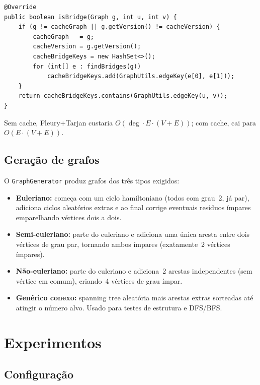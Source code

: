 \documentclass[12pt]{article}
\begin{document}
\begin{lstlisting}
@Override
public boolean isBridge(Graph g, int u, int v) {
    if (g != cacheGraph || g.getVersion() != cacheVersion) {
        cacheGraph   = g;
        cacheVersion = g.getVersion();
        cacheBridgeKeys = new HashSet<>();
        for (int[] e : findBridges(g))
            cacheBridgeKeys.add(GraphUtils.edgeKey(e[0], e[1]));
    }
    return cacheBridgeKeys.contains(GraphUtils.edgeKey(u, v));
}
\end{lstlisting}

Sem cache, Fleury+Tarjan custaria $O(\deg \cdot E \cdot (V{+}E))$; com
cache, cai para $O(E \cdot (V{+}E))$.

\subsection{Geração de grafos}

O \texttt{GraphGenerator} produz grafos dos três tipos exigidos:
\begin{itemize}
    \item \textbf{Euleriano:} começa com um ciclo hamiltoniano (todos com
          grau~2, já par), adiciona ciclos aleatórios extras e ao final
          corrige eventuais resíduos ímpares emparelhando vértices dois a
          dois.
    \item \textbf{Semi-euleriano:} parte do euleriano e adiciona uma única
          aresta entre dois vértices de grau par, tornando ambos ímpares
          (exatamente~2 vértices ímpares).
    \item \textbf{Não-euleriano:} parte do euleriano e adiciona~2 arestas
          independentes (sem vértice em comum), criando~4 vértices de grau
          ímpar.
    \item \textbf{Genérico conexo:} spanning tree aleatória mais arestas
          extras sorteadas até atingir o número alvo. Usado para testes de
          estrutura e DFS/BFS.
\end{itemize}

\section{Experimentos}

\subsection{Configuração}
\end{document}
